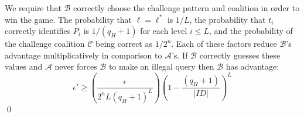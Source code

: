 \documentclass[10pt]{llncs}
\newcommand{\A}{\mathcal{A}}
\newcommand{\B}{\mathcal{B}}
\newcommand{\C}{\mathcal{C}}
\newcommand{\Zbb}{\mathbb{Z}}
\newcommand{\Gbb}{\mathbb{G}}
\newcommand{\ID}{\mathit{ID}}
\begin{document}
We require that $\B$ correctly choose the challenge pattern and coalition in order to win the game. The probability that $\ell = \ell^*$ is $1/L$, the probability that $t_i$ correctly identifies $P_i$ is $1/(q_H + 1)$ for each level $i \le L$, and the probability of the challenge coalition $\C$ being correct as $1/2^n$. Each of these factors reduce $\B$'s advantage multiplicatively in comparison to $\A$'s. If $\B$ correctly guesses these values and $\A$ never forces $\B$ to make an illegal query then $\B$ has advantage:
$$\epsilon' \ge \left(\frac{\epsilon}{2^n L (q_H + 1)^L}\right)\left(1 - \frac{(q_H + 1)}{|\mathcal{\ID}|}\right)^L$$
\qed

\begin{comment}
\section{Chosen-Ciphertext Security}
Transforming an adaptive chosen-plaintext secure (CPA) secure IBE scheme into a CCA-secure public-key scheme was originally proposed by Canetti, Halevi, and Katz \cite{CHK}. Their method was later improved for efficiency by Boneh and Katz \cite{BK}, and further research by Boyen, Mei, and Waters \cite{BMW} allowed for transformations with fewer dependencies outside the initial IBE scheme. Each of these methods allows for a parallel transformation of selective-identity CPA-secure IBE schemes in the standard model into nonselective-identity CCA-secure public-key scheme in the random oracle model using a proof similar to the one above.

We present a transformation descended from the Park and Lee's proof \cite{Park07} which directly transforms a selective-identity CPA-secure $L+1$ level multi-TA WIBE into a selective-identity CCA-secure $L$ level multi-TA WIBE in the standard model. While requiring a one-time signature scheme as in the original Canetti, Halevi, and Katz transformation, the Park and Lee transformation (and our extension thereof) does not require the padding of identities by one bit.

To achieve sWID-IND-CCA chosen-ciphertext security we require the addition of a strongly unforgeable signature scheme \emph{Sig = (SigKeyGen, Sign, Verify)} and a collision resistant hash function mapping verification keys to $\Zbb_p$ where $p$ is the order of $\Gbb$. For simplicity, we will assume a natural map of verification keys to $\Zbb_p$ and treat the keys as members of the finite field directly. Recall that $\Gbb$ is the group from which the public parameters of the HIBE are chosen, and that there is a bilinear map $e: \Gbb \times \Gbb \rightarrow \Gbb_T$ mapping onto the message space $\Gbb_T$. In mapping onto a WIBE of one fewer levels, the public parameters for the $L+1$ level are appropriated for the verification code. The new public parameters for the Boneh-Boyen based multi-TA WIBE become:


\end{comment}
\end{document}
